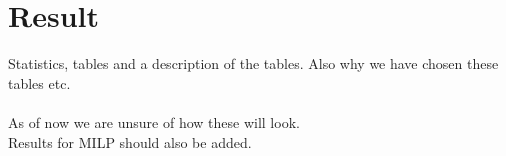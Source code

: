 \chapter{Result}
Statistics, tables and a description of the tables. Also why we have chosen these tables etc.\\\\
As of now we are unsure of how these will look.\\
Results for MILP should also be added.